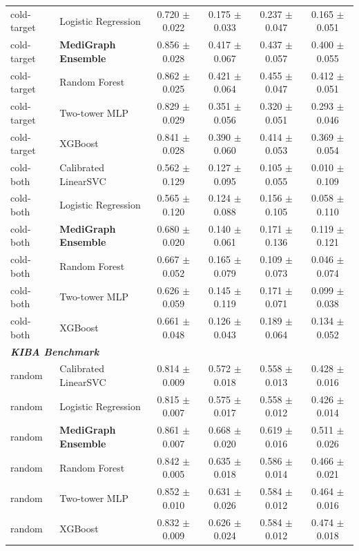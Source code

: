 \begin{table}[t]
\begin{tabular}{llcccc}
cold-target & Logistic Regression & 0.720 $\pm$ 0.022 & 0.175 $\pm$ 0.033 & 0.237 $\pm$ 0.047 & 0.165 $\pm$ 0.051 \\
cold-target & \textbf{MediGraph Ensemble} & 0.856 $\pm$ 0.028 & 0.417 $\pm$ 0.067 & 0.437 $\pm$ 0.057 & 0.400 $\pm$ 0.055 \\
cold-target & Random Forest & 0.862 $\pm$ 0.025 & 0.421 $\pm$ 0.064 & 0.455 $\pm$ 0.047 & 0.412 $\pm$ 0.051 \\
cold-target & Two-tower MLP & 0.829 $\pm$ 0.029 & 0.351 $\pm$ 0.056 & 0.320 $\pm$ 0.051 & 0.293 $\pm$ 0.046 \\
cold-target & XGBoost & 0.841 $\pm$ 0.028 & 0.390 $\pm$ 0.060 & 0.414 $\pm$ 0.053 & 0.369 $\pm$ 0.054 \\
\hline
cold-both & Calibrated LinearSVC & 0.562 $\pm$ 0.129 & 0.127 $\pm$ 0.095 & 0.105 $\pm$ 0.055 & 0.010 $\pm$ 0.109 \\
cold-both & Logistic Regression & 0.565 $\pm$ 0.120 & 0.124 $\pm$ 0.088 & 0.156 $\pm$ 0.105 & 0.058 $\pm$ 0.110 \\
cold-both & \textbf{MediGraph Ensemble} & 0.680 $\pm$ 0.020 & 0.140 $\pm$ 0.061 & 0.171 $\pm$ 0.136 & 0.119 $\pm$ 0.121 \\
cold-both & Random Forest & 0.667 $\pm$ 0.052 & 0.165 $\pm$ 0.079 & 0.109 $\pm$ 0.073 & 0.046 $\pm$ 0.074 \\
cold-both & Two-tower MLP & 0.626 $\pm$ 0.059 & 0.145 $\pm$ 0.119 & 0.171 $\pm$ 0.071 & 0.099 $\pm$ 0.038 \\
cold-both & XGBoost & 0.661 $\pm$ 0.048 & 0.126 $\pm$ 0.043 & 0.189 $\pm$ 0.064 & 0.134 $\pm$ 0.052 \\
\hline
\multicolumn{6}{l}{\textit{\textbf{KIBA Benchmark}}} \\
\hline
random & Calibrated LinearSVC & 0.814 $\pm$ 0.009 & 0.572 $\pm$ 0.018 & 0.558 $\pm$ 0.013 & 0.428 $\pm$ 0.016 \\
random & Logistic Regression & 0.815 $\pm$ 0.007 & 0.575 $\pm$ 0.017 & 0.558 $\pm$ 0.012 & 0.426 $\pm$ 0.014 \\
random & \textbf{MediGraph Ensemble} & 0.861 $\pm$ 0.007 & 0.668 $\pm$ 0.020 & 0.619 $\pm$ 0.016 & 0.511 $\pm$ 0.026 \\
random & Random Forest & 0.842 $\pm$ 0.005 & 0.635 $\pm$ 0.018 & 0.586 $\pm$ 0.014 & 0.466 $\pm$ 0.021 \\
random & Two-tower MLP & 0.852 $\pm$ 0.010 & 0.631 $\pm$ 0.026 & 0.584 $\pm$ 0.012 & 0.464 $\pm$ 0.016 \\
random & XGBoost & 0.832 $\pm$ 0.009 & 0.626 $\pm$ 0.024 & 0.584 $\pm$ 0.012 & 0.474 $\pm$ 0.018 \\

\end{tabular}
\end{table}
